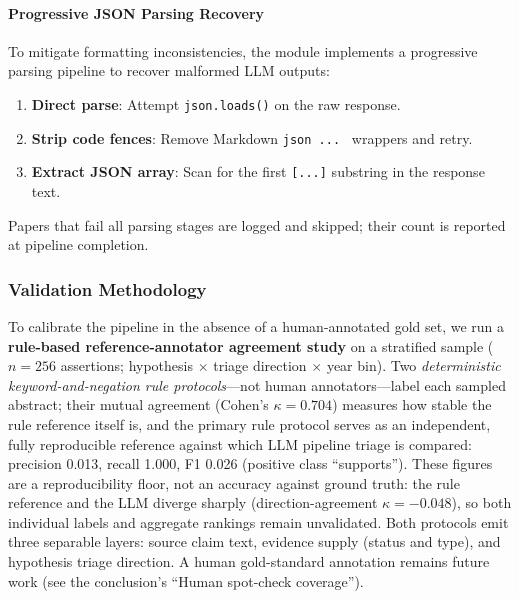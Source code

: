 \documentclass[
  english,
]{article}
\providecommand{\tightlist}{%
  \setlength{\itemsep}{0pt}\setlength{\parskip}{0pt}}
\begin{document}
\paragraph{Progressive JSON Parsing
Recovery}\label{progressive-json-parsing-recovery}

To mitigate formatting inconsistencies, the module implements a
progressive parsing pipeline to recover malformed LLM outputs:

\begin{enumerate}
\def\labelenumi{\arabic{enumi}.}
\tightlist
\item
  \textbf{Direct parse}: Attempt \texttt{json.loads()} on the raw
  response.
\item
  \textbf{Strip code fences}: Remove Markdown
  \texttt{\textasciigrave{}\textasciigrave{}\textasciigrave{}json\ ...\ \textasciigrave{}\textasciigrave{}\textasciigrave{}}
  wrappers and retry.
\item
  \textbf{Extract JSON array}: Scan for the first \texttt{{[}...{]}}
  substring in the response text.
\end{enumerate}

Papers that fail all parsing stages are logged and skipped; their count
is reported at pipeline completion.

\subsubsection{Validation Methodology}\label{validation-methodology}

To calibrate the pipeline in the absence of a human-annotated gold set,
we run a \textbf{rule-based reference-annotator agreement study} on a
stratified sample (\(n = 256\) assertions; hypothesis \(\times\) triage
direction \(\times\) year bin). Two \emph{deterministic
keyword-and-negation rule protocols}---not human annotators---label each
sampled abstract; their mutual agreement (Cohen's \(\kappa = 0.704\))
measures how stable the rule reference itself is, and the primary rule
protocol serves as an independent, fully reproducible reference against
which LLM pipeline triage is compared: precision 0.013, recall 1.000, F1
0.026 (positive class ``supports''). These figures are a reproducibility
floor, not an accuracy against ground truth: the rule reference and the
LLM diverge sharply (direction-agreement \(\kappa = -0.048\)), so both
individual labels and aggregate rankings remain unvalidated. Both
protocols emit three separable layers: source claim text, evidence
supply (status and type), and hypothesis triage direction. A human
gold-standard annotation remains future work (see the conclusion's
``Human spot-check coverage'').
\end{document}
